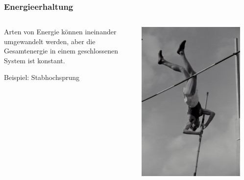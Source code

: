 \documentclass{beamer}
\begin{document}
\begin{frame}
\frametitle{Energieerhaltung}

\begin{columns}[c]

\begin{column}{5cm}
Arten von Energie können ineinander umgewandelt werden, aber die Gesamtenergie in einem geschlossenen System ist konstant. \\

\pause

Beispiel: Stabhochsprung

\end{column}

\begin{column}{5cm}
\begin{center}
\includegraphics[width=0.9\textwidth]{stabhochsprung.jpg}
\end{center}
\end{column}

\end{columns}

\end{frame}
\end{document}
